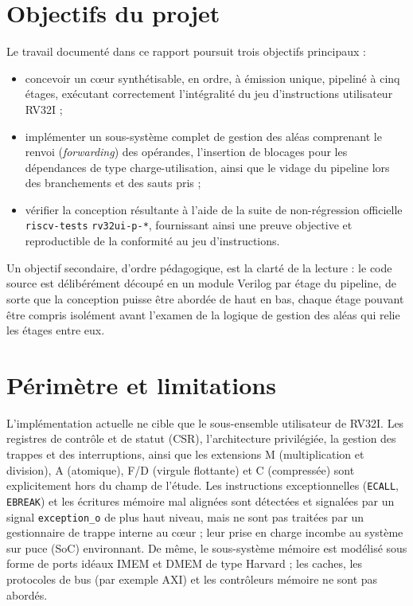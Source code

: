 \documentclass[11pt,a4paper,oneside]{report}
\begin{document}
\section{Objectifs du projet}
Le travail documenté dans ce rapport poursuit trois objectifs
principaux :
\begin{itemize}
  \item concevoir un c\oe{}ur synthétisable, en ordre, à émission
        unique, pipeliné à cinq étages, exécutant correctement
        l'intégralité du jeu d'instructions utilisateur RV32I ;
  \item implémenter un sous-système complet de gestion des aléas
        comprenant le renvoi (\textit{forwarding}) des opérandes,
        l'insertion de blocages pour les dépendances de type
        charge-utilisation, ainsi que le vidage du pipeline lors
        des branchements et des sauts pris ;
  \item vérifier la conception résultante à l'aide de la suite de
        non-régression officielle \texttt{riscv-tests}
        \texttt{rv32ui-p-*}, fournissant ainsi une preuve
        objective et reproductible de la conformité au jeu
        d'instructions.
\end{itemize}
Un objectif secondaire, d'ordre pédagogique, est la clarté de la
lecture : le code source est délibérément découpé en un module
Verilog par étage du pipeline, de sorte que la conception puisse
être abordée de haut en bas, chaque étage pouvant être compris
isolément avant l'examen de la logique de gestion des aléas qui
relie les étages entre eux.


\section{Périmètre et limitations}
L'implémentation actuelle ne cible que le sous-ensemble utilisateur
de RV32I. Les registres de contrôle et de statut (CSR),
l'architecture privilégiée, la gestion des trappes et des
interruptions, ainsi que les extensions M (multiplication et
division), A (atomique), F/D (virgule flottante) et C (compressée)
sont explicitement hors du champ de l'étude. Les instructions
exceptionnelles (\texttt{ECALL}, \texttt{EBREAK}) et les
écritures mémoire mal alignées sont détectées et signalées par un
signal \texttt{exception\_o} de plus haut niveau, mais ne sont pas
traitées par un gestionnaire de trappe interne au c\oe{}ur ; leur
prise en charge incombe au système sur puce (SoC) environnant. De
même, le sous-système mémoire est modélisé sous forme de ports
idéaux IMEM et DMEM de type Harvard ; les caches, les protocoles
de bus (par exemple AXI) et les contrôleurs mémoire ne sont pas
abordés.
\end{document}
